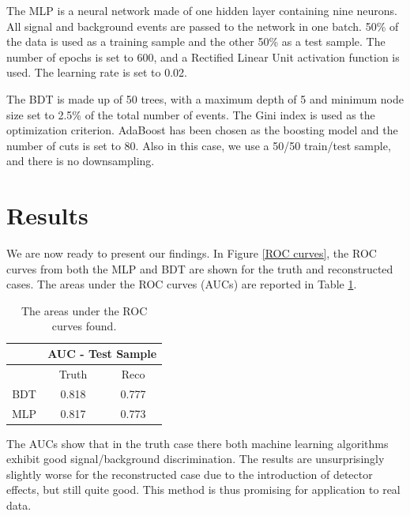 \documentclass[10pt,a4paper]{book}
\begin{document}
The MLP is a neural network made of one hidden layer containing nine neurons. All signal and background events are passed to the network in one batch. 50\% of the data is used as a training sample and the other 50\% as a test sample. The number of epochs is set to 600, and a Rectified Linear Unit activation function is used. The learning rate is set to 0.02. 

The BDT is made up of 50 trees, with a maximum depth of 5 and minimum node size set to 2.5\% of the total number of events. The Gini index is used as the optimization criterion. AdaBoost has been chosen as the boosting model and the number of cuts is set to 80. Also in this case, we use a 50/50 train/test sample, and there is no downsampling.


\section{Results}

We are now ready to present our findings. In Figure \ref{ROC curves}, the ROC curves from both the MLP and BDT are shown for the truth and reconstructed cases. The areas under the ROC curves (AUCs) are reported in Table \ref{AUC table}.

\begin{table}
\centering
\begin{tabular}{|c|c|c|}
\hline 
\* & \multicolumn{2}{c|}{AUC - Test Sample} \\ 
\hline 
\* & Truth & Reco \\ 
\hline 
BDT & 0.818 & 0.777 \\ 
\hline 
MLP & 0.817 & 0.773 \\  
\hline 
\end{tabular} 
\caption{The areas under the ROC curves found.}
\label{AUC table}
\end{table} 

The AUCs show that in the truth case there both machine learning algorithms exhibit good signal/background discrimination. The results are unsurprisingly slightly worse for the reconstructed case due to the introduction of detector effects, but still quite good. This method is thus promising for application to real data.
\end{document}
